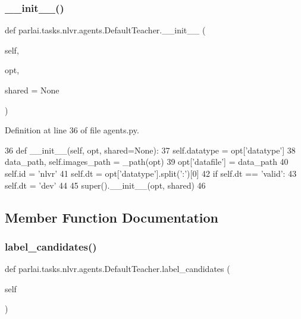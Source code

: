 \subsubsection{\texorpdfstring{\+\_\+\+\_\+init\+\_\+\+\_\+()}{\_\_init\_\_()}}
{\footnotesize\ttfamily def parlai.\+tasks.\+nlvr.\+agents.\+Default\+Teacher.\+\_\+\+\_\+init\+\_\+\+\_\+ (\begin{DoxyParamCaption}\item[{}]{self,  }\item[{}]{opt,  }\item[{}]{shared = {\ttfamily None} }\end{DoxyParamCaption})}



Definition at line 36 of file agents.\+py.


\begin{DoxyCode}
36     \textcolor{keyword}{def }\_\_init\_\_(self, opt, shared=None):
37         self.datatype = opt[\textcolor{stringliteral}{'datatype'}]
38         data\_path, self.images\_path = \_path(opt)
39         opt[\textcolor{stringliteral}{'datafile'}] = data\_path
40         self.id = \textcolor{stringliteral}{'nlvr'}
41         self.dt = opt[\textcolor{stringliteral}{'datatype'}].split(\textcolor{stringliteral}{':'})[0]
42         \textcolor{keywordflow}{if} self.dt == \textcolor{stringliteral}{'valid'}:
43             self.dt = \textcolor{stringliteral}{'dev'}
44 
45         super().\_\_init\_\_(opt, shared)
46 
\end{DoxyCode}


\subsection{Member Function Documentation}
\mbox{\label{classparlai_1_1tasks_1_1nlvr_1_1agents_1_1DefaultTeacher_adb1e3953e1686ae29212e74ad542ae35}} 
\subsubsection{\texorpdfstring{label\+\_\+candidates()}{label\_candidates()}}
{\footnotesize\ttfamily def parlai.\+tasks.\+nlvr.\+agents.\+Default\+Teacher.\+label\+\_\+candidates (\begin{DoxyParamCaption}\item[{}]{self }\end{DoxyParamCaption})}



